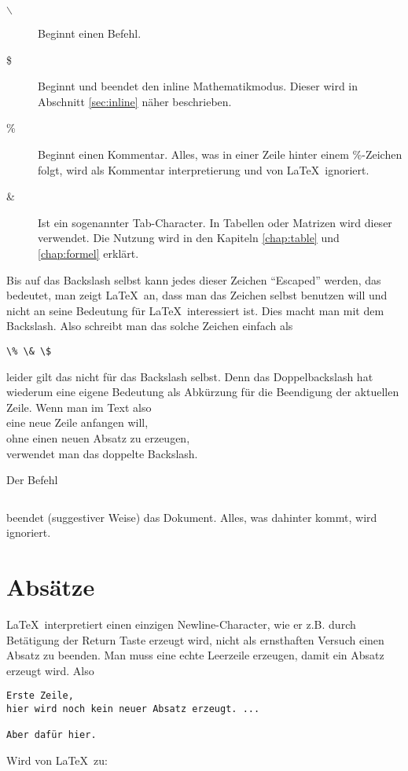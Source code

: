 \begin{description}
\item[$\backslash$] Beginnt einen Befehl.
\item[\$] Beginnt und beendet den inline Mathematikmodus. Dieser wird in Abschnitt \ref{sec:inline} näher beschrieben.
\item[\%] Beginnt einen Kommentar. Alles, was in einer Zeile hinter einem \%-Zeichen folgt, wird als Kommentar interpretierung und von \LaTeX\ ignoriert.
\item[\&] Ist ein sogenannter Tab-Character. In Tabellen oder Matrizen wird dieser verwendet. Die Nutzung wird in den Kapiteln \ref{chap:table} und \ref{chap:formel} erklärt.
\end{description}

Bis auf das Backslash selbst kann jedes dieser Zeichen "`Escaped"' werden, das bedeutet, man zeigt \LaTeX\ an, dass man das Zeichen selbst benutzen will und nicht an seine Bedeutung für \LaTeX\ interessiert ist. Dies macht man mit dem Backslash. Also schreibt man das solche Zeichen einfach als 
\begin{verbatim}
\% \& \$
\end{verbatim}
leider gilt das nicht für das Backslash selbst. Denn das Doppelbackslash hat wiederum eine eigene Bedeutung als Abkürzung für die Beendigung der aktuellen Zeile. Wenn man im Text also \\
eine neue Zeile anfangen will, \\
ohne einen neuen Absatz zu erzeugen, \\
verwendet man das doppelte Backslash.

Der Befehl 
\begin{verbatim}

\end{verbatim}
beendet (suggestiver Weise) das Dokument. Alles, was dahinter kommt, wird ignoriert. 


\section{Absätze}

\LaTeX\ interpretiert einen einzigen Newline-Character, wie er z.B. durch Betätigung der Return Taste erzeugt wird, nicht als ernsthaften Versuch einen Absatz zu beenden. Man muss eine echte Leerzeile erzeugen, damit ein Absatz erzeugt wird. Also
\begin{verbatim}
Erste Zeile,
hier wird noch kein neuer Absatz erzeugt. ...

Aber dafür hier.
\end{verbatim}
Wird von \LaTeX\ zu:

